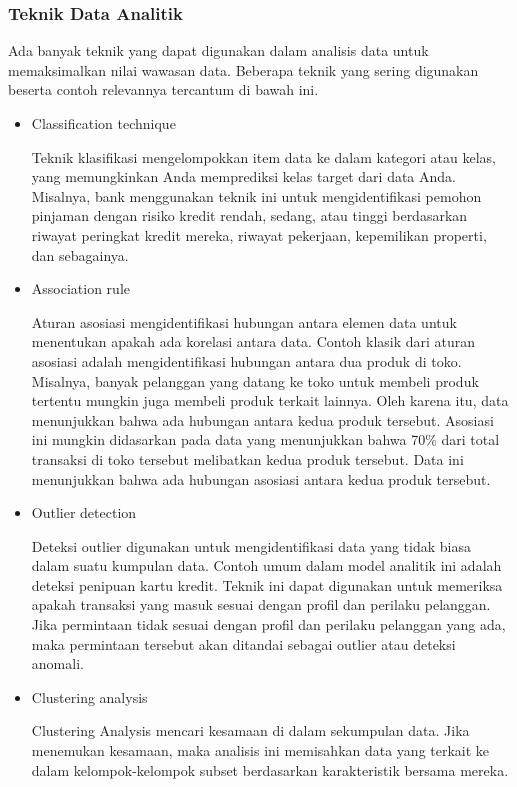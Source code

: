 \documentclass{article}
\begin{document}
\subsubsection{Teknik Data Analitik}
Ada banyak teknik yang dapat digunakan dalam analisis data untuk memaksimalkan nilai wawasan data. Beberapa teknik yang sering digunakan beserta contoh relevannya tercantum di bawah ini.
\begin{itemize}
    \item Classification technique

          Teknik klasifikasi mengelompokkan item data ke dalam kategori atau kelas, yang memungkinkan Anda memprediksi kelas target dari data Anda. Misalnya, bank menggunakan teknik ini untuk mengidentifikasi pemohon pinjaman dengan risiko kredit rendah, sedang, atau tinggi berdasarkan riwayat peringkat kredit mereka, riwayat pekerjaan, kepemilikan properti, dan sebagainya.

    \item Association rule

          Aturan asosiasi mengidentifikasi hubungan antara elemen data untuk menentukan apakah ada korelasi antara data. Contoh klasik dari aturan asosiasi adalah mengidentifikasi hubungan antara dua produk di toko. Misalnya, banyak pelanggan yang datang ke toko untuk membeli produk tertentu mungkin juga membeli produk terkait lainnya. Oleh karena itu, data menunjukkan bahwa ada hubungan antara kedua produk tersebut. Asosiasi ini mungkin didasarkan pada data yang menunjukkan bahwa 70\% dari total transaksi di toko tersebut melibatkan kedua produk tersebut. Data ini menunjukkan bahwa ada hubungan asosiasi antara kedua produk tersebut.

    \item Outlier detection

          Deteksi outlier digunakan untuk mengidentifikasi data yang tidak biasa dalam suatu kumpulan data. Contoh umum dalam model analitik ini adalah deteksi penipuan kartu kredit. Teknik ini dapat digunakan untuk memeriksa apakah transaksi yang masuk sesuai dengan profil dan perilaku pelanggan. Jika permintaan tidak sesuai dengan profil dan perilaku pelanggan yang ada, maka permintaan tersebut akan ditandai sebagai outlier atau deteksi anomali.

    \item Clustering analysis

          Clustering Analysis mencari kesamaan di dalam sekumpulan data. Jika menemukan kesamaan, maka analisis ini memisahkan data yang terkait ke dalam kelompok-kelompok subset berdasarkan karakteristik bersama mereka.


\end{itemize}
\end{document}
